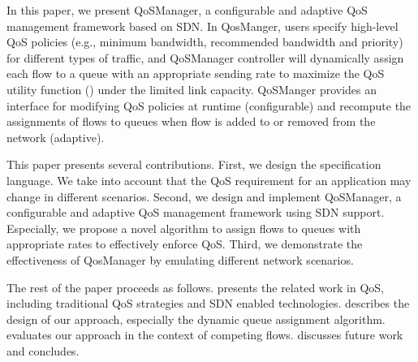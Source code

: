 In this paper, we present QoSManager, a configurable and adaptive QoS management framework based on SDN. In
QosManger, users specify high-level QoS policies (e.g., minimum bandwidth, recommended bandwidth and priority)
for different types of traffic, and QoSManager controller will dynamically assign each flow to a queue with an
appropriate sending rate to maximize the QoS utility function () under the limited link capacity.
QoSManger provides an interface for modifying QoS policies at runtime (configurable) and recompute the assignments
of flows to queues when flow is added to or removed from the network (adaptive).

This paper presents several contributions. First, we design the specification language. We take into account that the QoS requirement for an application may change in different scenarios. Second, we design and implement
QoSManager, a configurable and adaptive QoS management framework using SDN support. Especially, we propose a novel
algorithm to assign flows to queues with appropriate rates to effectively enforce QoS. Third, we demonstrate the
effectiveness of QosManager by emulating different network scenarios.

The rest of the paper proceeds as follows. 
 presents the related work in QoS, including traditional QoS strategies and SDN enabled technologies.
 describes the design of our approach, especially the dynamic queue assignment algorithm.
 evaluates our approach in the context of competing flows.  discusses future work
and concludes.
